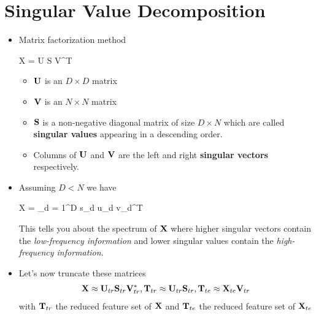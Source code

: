 \section{Singular Value Decomposition}
\begin{itemize}
	\item Matrix factorization method
	\begin{myalign*}
	    \*X = \*U \*S \*V^T
	\end{myalign*}
	\begin{itemize}
		\item $\mathbf{U}$ is an $D \times D$ matrix
		\item $\mathbf{V}$ is an $N \times N$ matrix
		\item $\mathbf{S}$ is a non-negative diagonal matrix of size $D \times N$ which are called \textbf{singular values} appearing in a descending order.
		\item Columns of $\mathbf{U}$ and $\mathbf{V}$ are the left and right \textbf{singular vectors} respectively.
	\end{itemize}
	\item Assuming $D < N$ we have
	\begin{myalign*}
	    \*X = \sum_{d = 1}^D s_d \*u_d \*v_d^T
	\end{myalign*}
	This tells you about the spectrum of $\mathbf{X}$ where higher singular vectors contain the \textit{low-frequency information} and lower singular values contain the \textit{high-frequency information}.
    \item Let's now truncate these matrices
    \begin{align*}
        \mathbf{X} \approx \mathbf{U}_{tr} \mathbf{S}_{tr} \mathbf{V}^*_{tr}, 
        \mathbf{T}_{tr} \approx \mathbf{U}_{tr} \mathbf{S}_{tr}, \mathbf{T}_{te} \approx \mathbf{X}_{te}\mathbf{V}_{tr}
    \end{align*}
    with $\mathbf{T}_{tr}$ the reduced feature set of $\mathbf{X}$ and $\mathbf{T}_{te}$ the reduced feature set of $\mathbf{X}_{te}$
\end{itemize}

